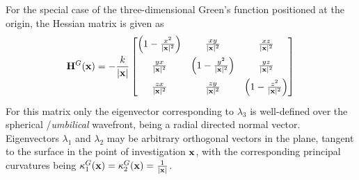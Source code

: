 For the special case of the three-dimensional Green's function positioned at the origin, the Hessian matrix is given as
\begin{equation}
\label{Eq:App:Greens_f_hessian}
\mathbf{H}^G(\mathbf{x}) = -\frac{k}{|\mathbf{x}|}
\begin{bmatrix} 
\left( 1-\frac{x^2}{|\mathbf{x}|^2} \right) & \frac{x y}{|\mathbf{x}|^2}                  & \frac{x z}{|\mathbf{x}|^2}                 \\[.7em]
\frac{y x}{|\mathbf{x}|^2}                  & \left( 1-\frac{y^2}{|\mathbf{x}|^2} \right) &\frac{y z}{|\mathbf{x}|^2}                  \\[.7em]
\frac{z x}{|\mathbf{x}|^2}                  & \frac{z y}{|\mathbf{x}|^2}                  &\left( 1-\frac{z^2}{|\mathbf{x}|^2} \right) \\[0.5em]    \end{bmatrix}
\end{equation} 
%
For this matrix only the eigenvector corresponding to $\lambda_3$ is well-defined over the spherical /\emph{umbilical} wavefront, being a radial directed normal vector.
Eigenvectors $\lambda_1$ and $\lambda_2$ may be arbitrary orthogonal vectors in the plane, tangent to the surface in the point of investigation $\mathbf{x}$, with the corresponding principal curvatures being $\kappa_1^G(\mathbf{x}) = \kappa_2^G(\mathbf{x}) = \frac{1}{|\mathbf{x}|}$.



